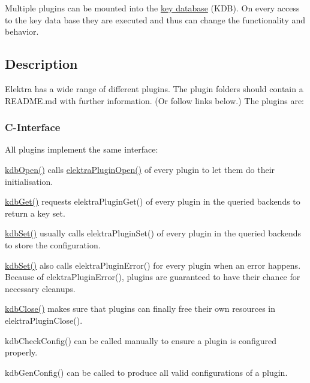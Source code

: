 Multiple plugins can be mounted into the \hyperlink{doc_help_elektra-glossary_md}{key database} (K\+DB). On every access to the key data base they are executed and thus can change the functionality and behavior.

\subsection*{Description}

Elektra has a wide range of different plugins. The plugin folders should contain a R\+E\+A\+D\+M\+E.\+md with further information. (Or follow links below.) The plugins are\+:

 \subsubsection*{C-\/\+Interface}

All plugins implement the same interface\+:


\begin{DoxyItemize}
\item {\ttfamily \hyperlink{group__kdb_ga6808defe5870f328dd17910aacbdc6ca}{kdb\+Open()}} calls {\ttfamily \hyperlink{elektra_2plugin_8c_a32a70a7876542c51d153164ac5108a57}{elektra\+Plugin\+Open()}} of every plugin to let them do their initialisation.
\item {\ttfamily \hyperlink{group__kdb_ga28e385fd9cb7ccfe0b2f1ed2f62453a1}{kdb\+Get()}} requests {\ttfamily elektra\+Plugin\+Get()} of every plugin in the queried backends to return a key set.
\item {\ttfamily \hyperlink{group__kdb_ga11436b058408f83d303ca5e996832bcf}{kdb\+Set()}} usually calls {\ttfamily elektra\+Plugin\+Set()} of every plugin in the queried backends to store the configuration.
\item {\ttfamily \hyperlink{group__kdb_ga11436b058408f83d303ca5e996832bcf}{kdb\+Set()}} also calls {\ttfamily elektra\+Plugin\+Error()} for every plugin when an error happens. Because of {\ttfamily elektra\+Plugin\+Error()}, plugins are guaranteed to have their chance for necessary cleanups.
\item {\ttfamily \hyperlink{group__kdb_gadb54dc9fda17ee07deb9444df745c96f}{kdb\+Close()}} makes sure that plugins can finally free their own resources in {\ttfamily elektra\+Plugin\+Close()}.
\item {\ttfamily kdb\+Check\+Config()} can be called manually to ensure a plugin is configured properly.
\item {\ttfamily kdb\+Gen\+Config()} can be called to produce all valid configurations of a plugin.
\end{DoxyItemize}

